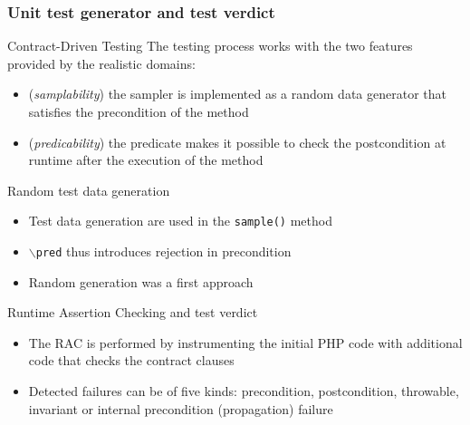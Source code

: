 \documentclass[10pt]{beamer}
\newcommand{\code}[1]{\texttt{#1}}
\newcommand{\outlinereminder}[0]{
  \frame{\frametitle{Outline}
  \tableofcontents[currentsection,subsectionstyle=show/show/hide]}
}
\begin{document}
\outlinereminder

\begin{frame}
\frametitle{Unit test generator and test verdict}

\begin{block}{Contract-Driven Testing}
The testing process works with the two features provided by the realistic
domains:
\begin{itemize}
\item ({\em samplability}) the sampler is implemented as a random data generator
that satisfies the precondition of the method
\item ({\em predicability}) the predicate makes it possible to check the
postcondition at runtime after the execution of the method
\end{itemize}
\end{block}

\begin{overprint}
\begin{block}{Random test data generation}
\begin{itemize}
\item Test data generation are used in the \code{sample()} method
\item $\backslash$\code{pred} thus introduces rejection in precondition
\item Random generation was a first approach
\end{itemize}
\end{block}

\begin{block}{Runtime Assertion Checking and test verdict}
\begin{itemize}
\item The RAC is performed by instrumenting the initial PHP code with additional
code that checks the contract clauses
\item Detected failures can be of five kinds: precondition, postcondition,
throwable, invariant or internal precondition (propagation) failure
\end{itemize}
\end{block}
\end{overprint}

\end{frame}
\end{document}
